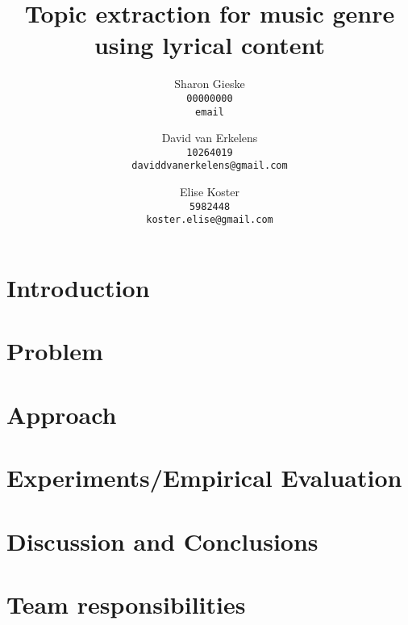 \documentclass{article} %
\title{Topic extraction for music genre using lyrical content}
\author{
Sharon Gieske \\
\texttt{00000000}\\
\texttt{email} \\
\and
David van Erkelens\\
\texttt{10264019}\\
\texttt{daviddvanerkelens@gmail.com} \\
\and
Elise Koster \\
\texttt{5982448}\\
\texttt{koster.elise@gmail.com}
}
\begin{document}
\maketitle

\begin{abstract}

\end{abstract}

\section{Introduction}


\section{Problem}


\section{Approach}


\section{Experiments/Empirical Evaluation}


\section{Discussion and Conclusions}


\section{Team responsibilities}

\end{document}
